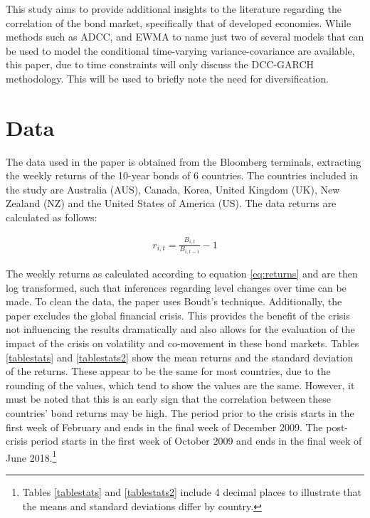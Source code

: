 \documentclass[11pt,preprint, authoryear]{elsarticle}
\numberwithin{equation}{section}
\numberwithin{figure}{section}
\numberwithin{table}{section}
\let\rmarkdownfootnote\footnote%
\def\footnote{\protect\rmarkdownfootnote}
\begin{document}
This study aims to provide additional insights to the literature
regarding the correlation of the bond market, specifically that of
developed economies. While methods such as ADCC, and EWMA to name just
two of several models that can be used to model the conditional
time-varying variance-covariance are available, this paper, due to time
constraints will only discuss the DCC-GARCH methodology. This will be
used to briefly note the need for diversification.

\section{\texorpdfstring{Data \label{data}}{Data }}\label{data}

The data used in the paper is obtained from the Bloomberg terminals,
extracting the weekly returns of the 10-year bonds of 6 countries. The
countries included in the study are Australia (AUS), Canada, Korea,
United Kingdom (UK), New Zealand (NZ) and the United States of America
(US). The data returns are calculated as follows:

\begin{align} \label{eq:returns}
r_{i,t} = \frac{B_{i,t}}{B_{i,t-1}} - 1
\end{align}

The weekly returns as calculated according to equation \ref{eq:returns}
and are then log transformed, such that inferences regarding level
changes over time can be made. To clean the data, the paper uses Boudt's
technique. Additionally, the paper excludes the global financial crisis.
This provides the benefit of the crisis not influencing the results
dramatically and also allows for the evaluation of the impact of the
crisis on volatility and co-movement in these bond markets. Tables
\ref{tablestats} and \ref{tablestats2} show the mean returns and the
standard deviation of the returns. These appear to be the same for most
countries, due to the rounding of the values, which tend to show the
values are the same. However, it must be noted that this is an early
sign that the correlation between these countries' bond returns may be
high. The period prior to the crisis starts in the first week of
February and ends in the final week of December 2009. The post-crisis
period starts in the first week of October 2009 and ends in the final
week of June 2018.\footnote{Tables \ref{tablestats} and
  \ref{tablestats2} include 4 decimal places to illustrate that the
  means and standard deviations differ by country.}
\end{document}
